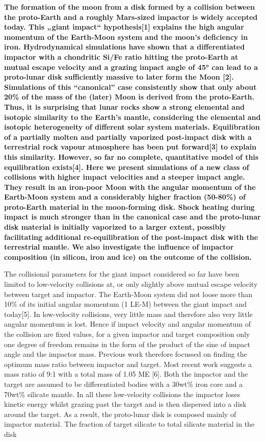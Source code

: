 \textbf{The formation of the moon from a disk formed by a collision between the proto-Earth and a roughly Mars-sized impactor is widely accepted today. This „giant impact“ hypothesis[1] explains the high angular momentum of the Earth-Moon system and the moon's deficiency in iron. Hydrodynamical simulations have shown that a differentiated impactor with a chondritic Si/Fe ratio hitting the proto-Earth at mutual escape velocity and a grazing impact angle of 45° can lead to a proto-lunar disk sufficiently massive to later form the Moon [2]. Simulations of this “canonical” case consistently show that only about 20\% of the mass of the (later) Moon is derived from the proto-Earth. Thus, it is surprising that lunar rocks show a strong elemental and isotopic similarity to the Earth's mantle, considering the elemental and isotopic heterogeneity of different solar system materials. Equilibration of a partially molten and partially vaporized post-impact disk with a terrestrial rock vapour atmosphere has been put forward[3] to explain this similarity. However, so far no complete, quantitative model of this equilibration exists[4]. Here we present simulations of a new class of collisions with higher impact velocities and a steeper impact angle. They result in an iron-poor Moon with the angular momentum of the Earth-Moon system and a considerably higher fraction (50-80\%) of proto-Earth material in the moon-forming disk. Shock heating during impact is much stronger than in the canonical case and the proto-lunar disk material is initially vaporized to a larger extent, possibly facilitating additional re-equilibration of the post-impact disk with the terrestrial mantle. We also investigate the influence of impactor composition (in silicon, iron and ice) on the outcome of the collision.}

The collisional parameters for the giant impact considered so far have been limited to low-velocity collisions at, or only slightly above mutual escape velocity between target and impactor. The Earth-Moon system did not loose more than 10\% of its initial angular momentum (1 LE-M) between the giant impact and today[5]. In low-velocity collisions, very little mass and therefore also very little angular momentum is lost. Hence if impact velocity and angular momentum of the collision are fixed values, for a given impactor and target composition only one degree of freedom remains in the form of the product of the sine of impact angle and the impactor mass. Previous work therefore focussed on finding the optimum mass ratio between impactor and target. Most recent work suggests a mass ratio of 9:1 with a total mass of 1.05 ME [6]. Both the impactor and the target are assumed to be differentiated bodies with a 30wt\% iron core and a 70wt\% silicate mantle. In all these low-velocity collisions the impactor loses kinetic energy whilst grazing past the target and is then dispersed into a disk around the target. As a result, the proto-lunar disk is composed mainly of impactor material. The fraction of target silicate to total silicate material in the disk

